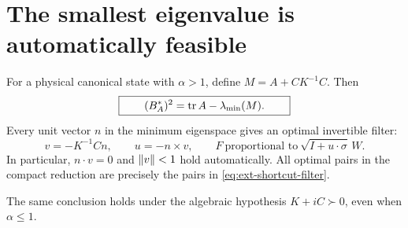 \section{The smallest eigenvalue is automatically feasible}
\label{sec:ext-shortcut}

\begin{theorem}
\label{thm:ext-shortcut}
For a physical canonical state with $\alpha>1$, define
$M=A+CK^{-1}C$. Then
\begin{equation}
 \boxed{\qquad (B_A^*)^2=\operatorname{tr} A-\lambda_{\min}(M).\qquad}
 \label{eq:ext-shortcut}
\end{equation}
Every unit vector $n$ in the minimum eigenspace gives an optimal
invertible filter:
\begin{equation}
 v=-K^{-1}Cn,\qquad u=-n\times v,\qquad
 F\ \text{proportional to}\ \sqrt{I+u\cdot\sigma}\,W.
 \label{eq:ext-shortcut-filter}
\end{equation}
In particular, $n\cdot v=0$ and $\left\lVert v\right\rVert<1$ hold automatically.
All optimal pairs in the compact reduction are precisely the pairs in
\eqref{eq:ext-shortcut-filter}.

The same conclusion holds under the algebraic hypothesis
$K+iC\succ0$, even when $\alpha\le1$.
\end{theorem}

